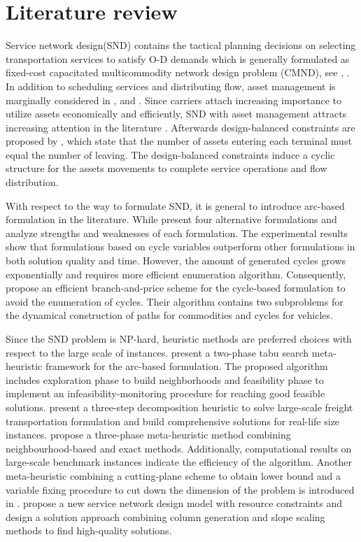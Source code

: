 \documentclass[11pt,nonblindrev,fleqn]{article}
\begin{document}
\section{Literature review}
Service network design(SND) contains the tactical planning decisions on selecting transportation services to satisfy O-D demands which is generally formulated as fixed-cost capacitated multicommodity network design problem (CMND), see \cite{Magnanti1984Network}, \cite{Minoux1989Networks}. In addition to scheduling services and distributing flow, asset management is marginally considered in \cite{Crainic2000Service}, \cite{Smilowitz2002Deferred} and \cite{crainic2003long}. Since carriers attach increasing importance to utilize assets economically and efficiently, SND with asset management attracts increasing attention in the literature \citep{Andersen2009bService,Teypaz2010A}.   Afterwards design-balanced constraints are proposed by \cite{Pedersen2009Models}, which state that the number of assets entering each terminal must equal the number of leaving. The design-balanced constraints induce a cyclic structure for the assets movements to complete service operations and flow distribution.

With respect to the way to formulate SND, it is general to introduce arc-based formulation in the literature. While \cite{Andersen2009bService} present four alternative formulations and analyze strengths and weaknesses of each formulation. The experimental results show that formulations based on cycle variables outperform other formulations in both solution quality and time. However, the amount of generated cycles grows exponentially and requires more efficient enumeration algorithm. Consequently, \cite{Andersen2011Branch} propose an efficient branch-and-price scheme for the cycle-based formulation to avoid the enumeration of cycles. Their algorithm contains two subproblems for the dynamical construction of paths for commodities and cycles for vehicles.

Since the SND problem is NP-hard, heuristic methods are preferred choices with respect to the large scale of instances. \cite{Pedersen2009Models} present a two-phase tabu search meta-heuristic framework for the arc-based formulation. The proposed algorithm includes exploration phase to build neighborhoods and feasibility phase to implement an infeasibility-monitoring procedure for reaching good feasible solutions. \cite{Teypaz2010A} present a three-step decomposition heuristic to solve large-scale freight transportation formulation and build comprehensive solutions for real-life size instances. \cite{VuDucToulouse} propose a three-phase meta-heuristic method combining neighbourhood-based and exact methods. Additionally, computational results on large-scale benchmark instances indicate the efficiency of the algorithm. Another meta-heuristic combining a cutting-plane scheme to obtain lower bound and a variable ﬁxing procedure to cut down the dimension of the problem is introduced in \cite{Chouman2015Cutting}. \cite{Crainic2016Service} propose a new service network design model with resource constraints and design a solution approach combining column generation and slope scaling methods to find high-quality solutions.
\end{document}

